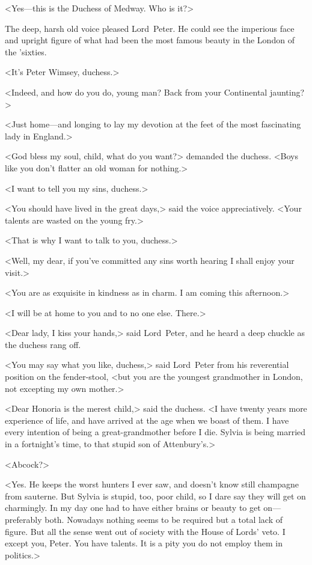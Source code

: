 <Yes—this is the Duchess of Medway. Who is it?>

The deep, harsh old voice pleased Lord~Peter. He could see the imperious face and upright figure of what had been the most famous beauty in the London of the 'sixties.

<It's Peter Wimsey, duchess.>

<Indeed, and how do you do, young man? Back from your Continental jaunting?>

<Just home—and longing to lay my devotion at the feet of the most fascinating lady in England.>

<God bless my soul, child, what do you want?> demanded the duchess. <Boys like you don't flatter an old woman for nothing.>

<I want to tell you my sins, duchess.>

<You should have lived in the great days,> said the voice appreciatively. <Your talents are wasted on the young fry.>

<That is why I want to talk to you, duchess.>

<Well, my dear, if you've committed any sins worth hearing I shall enjoy your visit.>

<You are as exquisite in kindness as in charm. I am coming this afternoon.>

<I will be at home to you and to no one else. There.>

<Dear lady, I kiss your hands,> said Lord~Peter, and he heard a deep chuckle as the duchess rang off.

\divider
<You may say what you like, duchess,> said Lord~Peter from his reverential position on the fender-stool, <but you are the youngest grandmother in London, not excepting my own mother.>

<Dear Honoria is the merest child,> said the duchess. <I have twenty years more experience of life, and have arrived at the age when we boast of them. I have every intention of being a great-grandmother before I die. Sylvia is being married in a fortnight's time, to that stupid son of Attenbury's.>

<Abcock?>

<Yes. He keeps the worst hunters I ever saw, and doesn't know still champagne from sauterne. But Sylvia is stupid, too, poor child, so I dare say they will get on charmingly. In my day one had to have either brains or beauty to get on—preferably both. Nowadays nothing seems to be required but a total lack of figure. But all the sense went out of society with the House of Lords' veto. I except you, Peter. You have talents. It is a pity you do not employ them in politics.>


